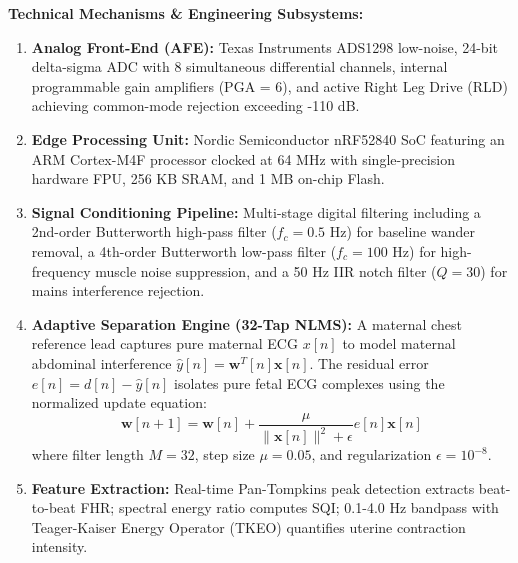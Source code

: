 \documentclass[10pt,a4paper]{article}
\begin{document}
\noindent
\textbf{Technical Mechanisms \& Engineering Subsystems:}
\begin{enumerate}[leftmargin=1.6em]
    \item \textbf{Analog Front-End (AFE):} Texas Instruments ADS1298 low-noise, 24-bit delta-sigma ADC with 8 simultaneous differential channels, internal programmable gain amplifiers (PGA = 6), and active Right Leg Drive (RLD) achieving common-mode rejection exceeding -110 dB.
    \item \textbf{Edge Processing Unit:} Nordic Semiconductor nRF52840 SoC featuring an ARM Cortex-M4F processor clocked at 64 MHz with single-precision hardware FPU, 256 KB SRAM, and 1 MB on-chip Flash.
    \item \textbf{Signal Conditioning Pipeline:} Multi-stage digital filtering including a 2nd-order Butterworth high-pass filter ($f_c = 0.5$ Hz) for baseline wander removal, a 4th-order Butterworth low-pass filter ($f_c = 100$ Hz) for high-frequency muscle noise suppression, and a 50 Hz IIR notch filter ($Q = 30$) for mains interference rejection.
    \item \textbf{Adaptive Separation Engine (32-Tap NLMS):} A maternal chest reference lead captures pure maternal ECG $x[n]$ to model maternal abdominal interference $\hat{y}[n] = \mathbf{w}^T[n]\mathbf{x}[n]$. The residual error $e[n] = d[n] - \hat{y}[n]$ isolates pure fetal ECG complexes using the normalized update equation:
    \begin{equation}
        \mathbf{w}[n+1] = \mathbf{w}[n] + \frac{\mu}{\|\mathbf{x}[n]\|^2 + \epsilon} e[n] \mathbf{x}[n]
    \end{equation}
    where filter length $M = 32$, step size $\mu = 0.05$, and regularization $\epsilon = 10^{-8}$.
    \item \textbf{Feature Extraction:} Real-time Pan-Tompkins peak detection extracts beat-to-beat FHR; spectral energy ratio computes SQI; 0.1-4.0 Hz bandpass with Teager-Kaiser Energy Operator (TKEO) quantifies uterine contraction intensity.
\end{enumerate}

\vspace{0.4em}
\noindent
{}
\end{document}
